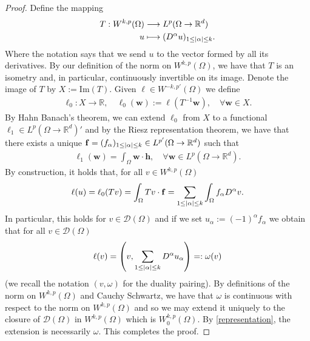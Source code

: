 \documentclass[
    a4paper,
    DIV=14,
    abstract=true,
    numbers=noenddot
]
{scrartcl}
\theoremstyle{definition}
\newcommand{\rm}[1]{\mathrm{#1}}
\newcommand{\R}{\mathbb{R}}
\newcommand{\Dd}{\mathcal{D}}
\begin{document}
\begin{proof}
    Define the mapping
    \begin{align*}
        T: W^{k,p}(\Omega ) & \longrightarrow L^p(\Omega \to \R^d)                \\
        u                   & \longmapsto(D^\alpha u)_{1 \leq\abs{\alpha}\leq k}.
    \end{align*}
    Where the notation says that we send $u$ to the vector formed by all its derivatives. By our definition of the norm on $W^{k,p}(\Omega )$, we have that $T$ is an isometry and, in particular, continuously invertible on its image. Denote the image of $T$ by $X:=\rm{Im}(T)$. Given $\ell \in W^{-k,p'}(\Omega )$ we define
    \begin{align*}
        \ell_0: X \to \R, \quad \ell_0(\mathbf{w}):= \ell(T^{-1}\mathbf{w}), \quad \forall \mathbf{w} \in X.
    \end{align*}
    By Hahn Banach's theorem, we can extend $\ell_0$ from $X$ to a functional $\ell_1 \in  L^p(\Omega \to \R^d)'$ and by the Riesz representation theorem, we have that there exists a unique $\mathbf{f}=(f_\alpha)_{1\leq \abs{\alpha}\leq k }\in L^{p'}(\Omega \to \R^d)$ such that
    \begin{align*}
        \ell_1(\mathbf{w})=\int_{\Omega}\mathbf{w}\cdot \mathbf{h}, \quad \forall \mathbf{w} \in L^p(\Omega \to \R^d).
    \end{align*}
    By construction, it holds that, for all $v \in W^{k,p}(\Omega )$
    \begin{align*}
        \ell(u)=\ell_0(Tv)=\int_{\Omega}Tv\cdot \mathbf{f}=\sum_{1\leq\left| \alpha \right|\leq k}\int_{\Omega}f_\alpha D^\alpha v .
    \end{align*}
    In particular, this holds for $v \in \Dd(\Omega )$ and if we set $u_\alpha:=(-1)^\alpha f_\alpha$ we obtain that for all $v \in \Dd(\Omega )$
    \begin{align}\label{representation}
        \ell(v)=\left(v,\sum_{1\leq\left| \alpha \right|\leq k} D^\alpha u_\alpha\right)=: \omega(v)
    \end{align}
    (we recall the notation $(v,\omega)$ for the duality pairing). By definitions of the norm on $W^{k,p}(\Omega )$ and Cauchy Schwartz, we have that $\omega$ is continuous with respect to the norm on $W^{k,p}(\Omega )$ and so we may extend it uniquely to the closure of $\Dd(\Omega )$ in $W^{k,p}(\Omega )$ which is $W^{k,p}_0(\Omega )$. By \eqref{representation}, the extension is necessarily $\omega$. This completes the proof.
\end{proof}
\end{document}
